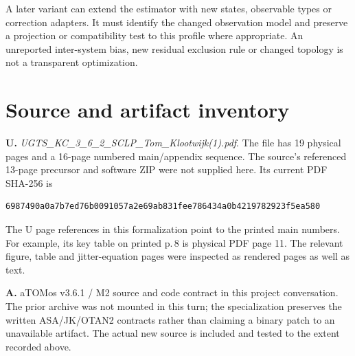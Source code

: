 \documentclass[11pt,a4paper]{article}
\begin{document}
A later variant can extend the estimator with new states, observable types or correction
adapters. It must identify the changed observation model and preserve a projection or
compatibility test to this profile where appropriate. An unreported inter-system bias,
new residual exclusion rule or changed topology is not a transparent optimization.
\clearpage

\section{Source and artifact inventory}
\textbf{U.} \emph{UGTS\_KC\_3\_6\_2\_SCLP\_Tom\_Klootwijk(1).pdf}. The file has
19 physical pages and a 16-page numbered main/appendix sequence. The source's referenced
13-page precursor and software ZIP were not supplied here. Its current PDF SHA-256 is
\begin{lstlisting}
6987490a0a7b7ed76b0091057a2e69ab831fee786434a0b4219782923f5ea580
\end{lstlisting}
The U page references in this formalization point to the printed main numbers. For
example, its key table on printed p.\,8 is physical PDF page 11. The relevant figure,
table and jitter-equation pages were inspected as rendered pages as well as text.

\textbf{A.} aTOMos v3.6.1 / M2 source and code contract in this project conversation.
The prior archive was not mounted in this turn; the specialization preserves the
written ASA/JK/OTAN2 contracts rather than claiming a binary patch to an unavailable
artifact. The actual new source is included and tested to the extent recorded above.
\end{document}
